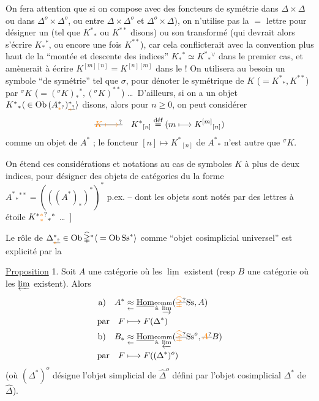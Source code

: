 On fera attention que si on compose avec  des foncteurs de symétrie   dans $\mathbb{\Delta}\times\mathbb{\Delta}$ ou dans $\mathbb{\Delta}^o\times\mathbb{\Delta}^o$, ou entre $\mathbb{\Delta}\times\mathbb{\Delta}^o$ et $\mathbb{\Delta}^o\times\mathbb{\Delta}$), on n'utilise pas la $=$ lettre pour désigner un   (tel que $K^*{}_*$ ou $K^{**}$ disons) ou son transformé (qui devrait alors s'écrire $K_*{}^*$, ou encore une fois $K^{**}$), car cela conflicterait avec la convention plus haut de la ``montée et descente des indices'' $K_*{}^*\simeq K^*{}_*{}^\vee$ dans le premier cas, et  amènerait à écrire $K^{[m][n]}=K^{[n][m]}$ dans le  ! On utilisera au besoin un symbole ``de symétrie'' tel que $\sigma$, pour dénoter le symétrique de $K$ ($=K^*{}_*,K^{**}$) par $ {}^{\sigma}K$ ($=({}^{\sigma}K)_*{}^*,({}^{\sigma}K)^{**}$) \ldots\ D'ailleurs,  si on a un objet $K^*{}_*\inserted{{}\in\mathrm{Ob}\,(A_{\unsure{*}}^{*})^{*}_{\deleted{\unsure{*}}}}$ disons, alors pour  $n\geq0$, on peut considérer
\[
 \deleted{\unsure{K\longmapsto}}\quad K^*{}_{[n]}\overset{\text{déf}}{=}(m\longmapsto K^{[m]}{}_{[n]})
\]
comme un objet de $A^*$ ; le foncteur $[n]\longmapsto K^*{}_{[n]}$ de $A^*{}_*$ n'est autre que $ {}^{\sigma}K$.

On étend ces considérations et notations au cas de symboles $K$ à plus de deux indices, pour désigner des objets de catégories du
la forme $A^*{}_*{}^{**}=(((A^*)_*)^*)^*$  p.ex. -- dont les objets sont notés  par des lettres à étoile $K^{*}\unsure{{}^{*}_{*}}{}_*{}^{*}$ \ldots\ ]

Le rôle de $\Delta^*_{\deleted{\unsure{*}}}\in\mathrm{Ob}\,\widehat{\mathbb{\Delta}}^*\inserted{{}=\mathrm{Ob}\,\mathrm{Ss}^*}$ comme ``objet cosimplicial universel'' est explicité par la

\uline{Proposition} 1. Soit $A$ une catégorie où les $\underline{\lim}$ existent (resp $B$ une catégorie où les $\varprojlim$ existent). Alors
\[
 \begin{aligned}
 \text{a)}\quad A^*&\underset{\leftarrow}{\approx}\underline{\mathrm{Hom}}_{\substack{\text{comm}\\\text{à }\varinjlim}}(\deleted{\unsure{\widehat{\mathbb{\Delta}}}}\mathrm{Ss},A)\\
 \text{par}\quad F&\longmapsto F(\Delta^*)\\
 \text{b)}\quad B_*&\underset{\leftarrow}{\approx}\underline{\mathrm{Hom}}_{\substack{\text{comm}\\\text{à }\varprojlim}}(\deleted{\unsure{\widehat{\mathbb{\Delta}}}}\mathrm{Ss}^{o},\deleted{\unsure{A}}B)\\
 \text{par}\quad F&\longmapsto F((\Delta^*)^o)
 \end{aligned}
\]
(où $(\Delta^*)^o$ désigne l'objet simplicial de $\widehat{\mathbb{\Delta}}^o$ défini par l'objet cosimplicial $\Delta^*$ de $\widehat{\mathbb{\Delta}}$).

